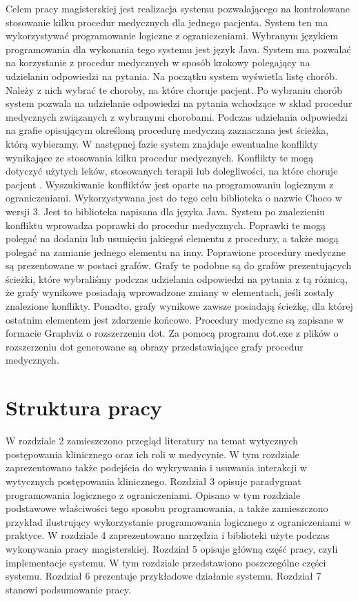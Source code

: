 \documentclass[oneside,a4paper]{book}
\begin{document}
\begin{spacing}{1.5}
Celem pracy magisterskiej jest realizacja systemu pozwalającego na kontrolowane stosowanie kilku procedur medycznych dla jednego pacjenta. System ten ma wykorzystywać programowanie logiczne z ograniczeniami. Wybranym językiem programowania dla wykonania tego systemu jest język Java. System ma pozwalać na korzystanie z procedur medycznych w sposób krokowy polegający na udzielaniu odpowiedzi na pytania. Na początku system wyświetla listę chorób. Należy z nich wybrać te choroby, na które choruje pacjent. Po wybraniu chorób system pozwala na udzielanie odpowiedzi na pytania wchodzące w skład procedur medycznych związanych z wybranymi chorobami. Podczas udzielania odpowiedzi na grafie opisującym określoną procedurę medyczną zaznaczana jest ścieżka, którą wybieramy. W następnej fazie system znajduje ewentualne konflikty wynikające ze stosowania kilku procedur medycznych. Konflikty te mogą dotyczyć użytych leków, stosowanych terapii lub dolegliwości, na które choruje pacjent . Wyszukiwanie konfliktów jest oparte na programowaniu logicznym z ograniczeniami. Wykorzystywana jest do tego celu biblioteka o nazwie Choco w wersji 3. Jest to biblioteka napisana dla języka Java. System po znalezieniu konfliktu wprowadza poprawki do procedur medycznych. Poprawki te mogą polegać na dodaniu lub usunięciu jakiegoś elementu z procedury, a także mogą polegać na zamianie jednego elementu na inny. Poprawione procedury medyczne są prezentowane w postaci  grafów. Grafy te podobne są do grafów prezentujących ścieżki, które wybraliśmy podczas udzielania odpowiedzi na pytania z tą różnicą, że grafy wynikowe posiadają wprowadzone zmiany w elementach, jeśli zostały znalezione konflikty. Ponadto, grafy wynikowe zawsze posiadają ścieżkę, dla której ostatnim elementem jest zdarzenie końcowe. Procedury medyczne są zapisane w formacie Graphviz o rozszerzeniu dot. Za pomocą programu dot.exe z plików o rozszerzeniu dot generowane są obrazy przedstawiające grafy procedur medycznych. 

\section{Struktura pracy}

W rozdziale 2 zamieszczono przegląd literatury na temat wytycznych postępowania klinicznego oraz ich roli w medycynie. W tym rozdziale zaprezentowano także podejścia do wykrywania i usuwania interakcji w wytycznych postępowania klinicznego. Rozdział 3 opisuje paradygmat programowania logicznego z ograniczeniami. Opisano w tym rozdziale podstawowe właściwości tego sposobu programowania, a także zamieszczono przykład ilustrujący wykorzystanie programowania logicznego z ograniczeniami w praktyce. W rozdziale 4 zaprezentowano narzędzia i biblioteki użyte podczas wykonywania pracy magisterskiej. Rozdział 5 opisuje główną część pracy, czyli implementacje systemu. W tym rozdziale przedstawiono poszczególne części systemu. Rozdział 6 prezentuje przykładowe działanie systemu. Rozdział 7 stanowi podsumowanie pracy. 


\end{spacing}
\end{document}

